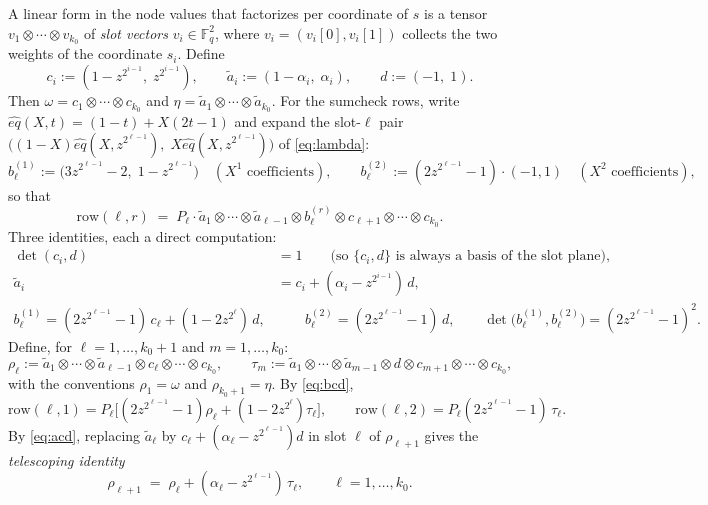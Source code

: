 \documentclass{article}
\newcommand{\Fq}{\mathbb{F}_q}
\theoremstyle{definition}
\begin{document}
A linear form in the node values that factorizes per coordinate of $s$ is a tensor $v_1 \otimes \cdots \otimes v_{k_0}$ of \emph{slot vectors} $v_i \in \Fq^2$, where $v_i = (v_i[0], v_i[1])$ collects the two weights of the coordinate $s_i$. Define
\[
c_i := (1 - z^{2^{i-1}},\; z^{2^{i-1}}), \qquad \tilde{a}_i := (1 - \alpha_i,\; \alpha_i), \qquad d := (-1,\; 1) .
\]
Then $\omega = c_1 \otimes \cdots \otimes c_{k_0}$ and $\eta = \tilde{a}_1 \otimes \cdots \otimes \tilde{a}_{k_0}$. For the sumcheck rows, write $\hat{eq}(X, t) = (1 - t) + X(2t - 1)$ and expand the slot-$\ell$ pair $\big((1-X)\hat{eq}(X, z^{2^{\ell-1}}),\; X \hat{eq}(X, z^{2^{\ell-1}})\big)$ of \cref{eq:lambda}:
\[
b^{(1)}_\ell := \big(3z^{2^{\ell-1}} - 2,\; 1 - z^{2^{\ell-1}}\big) \quad (X^1 \text{ coefficients}), \qquad
b^{(2)}_\ell := (2z^{2^{\ell-1}} - 1) \cdot (-1, 1) \quad (X^2 \text{ coefficients}),
\]
so that
\[
\text{row}(\ell, r) \;=\; P_\ell \cdot \tilde{a}_1 \otimes \cdots \otimes \tilde{a}_{\ell - 1} \otimes b^{(r)}_\ell \otimes c_{\ell + 1} \otimes \cdots \otimes c_{k_0} .
\]
Three identities, each a direct computation:
\begin{align}
\det(c_i, d) &= 1 \qquad \text{(so $\{c_i, d\}$ is always a basis of the slot plane)}, \label{eq:cd}\\
\tilde{a}_i &= c_i + (\alpha_i - z^{2^{i-1}})\, d , \label{eq:acd}\\
b^{(1)}_\ell = (2z^{2^{\ell-1}} - 1)\, c_\ell + (1 - 2z^{2^{\ell}})\, d , &\qquad b^{(2)}_\ell = (2z^{2^{\ell-1}} - 1)\, d , \qquad \det\big(b^{(1)}_\ell, b^{(2)}_\ell\big) = (2z^{2^{\ell-1}} - 1)^2 . \label{eq:bcd}
\end{align}
Define, for $\ell = 1, \dots, k_0 + 1$ and $m = 1, \dots, k_0$:
\[
\rho_\ell := \tilde{a}_1 \otimes \cdots \otimes \tilde{a}_{\ell-1} \otimes c_\ell \otimes \cdots \otimes c_{k_0}, \qquad
\tau_m := \tilde{a}_1 \otimes \cdots \otimes \tilde{a}_{m-1} \otimes d \otimes c_{m+1} \otimes \cdots \otimes c_{k_0},
\]
with the conventions $\rho_1 = \omega$ and $\rho_{k_0 + 1} = \eta$. By \cref{eq:bcd},
\begin{equation}\label{eq:rows}
\text{row}(\ell, 1) = P_\ell \big[(2z^{2^{\ell-1}} - 1)\rho_\ell + (1 - 2z^{2^{\ell}})\tau_\ell\big], \qquad \text{row}(\ell, 2) = P_\ell (2z^{2^{\ell-1}} - 1)\, \tau_\ell .
\end{equation}
By \cref{eq:acd}, replacing $\tilde{a}_\ell$ by $c_\ell + (\alpha_\ell - z^{2^{\ell-1}})d$ in slot $\ell$ of $\rho_{\ell + 1}$ gives the \emph{telescoping identity}
\begin{equation}\label{eq:telescope}
\rho_{\ell + 1} \;=\; \rho_\ell + (\alpha_\ell - z^{2^{\ell-1}})\, \tau_\ell , \qquad \ell = 1, \dots, k_0 .
\end{equation}
\end{document}
